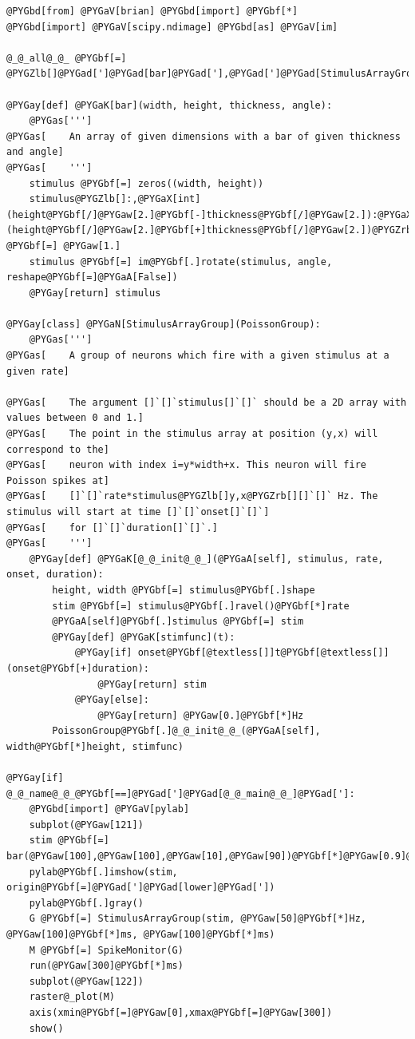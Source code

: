 \documentclass[letterpaper,10pt,english]{manual}
\begin{document}
\begin{Verbatim}[commandchars=@\[\]]
@PYGbd[from] @PYGaV[brian] @PYGbd[import] @PYGbf[*]
@PYGbd[import] @PYGaV[scipy.ndimage] @PYGbd[as] @PYGaV[im]

@_@_all@_@_ @PYGbf[=] @PYGZlb[]@PYGad[']@PYGad[bar]@PYGad['],@PYGad[']@PYGad[StimulusArrayGroup]@PYGad[']@PYGZrb[]

@PYGay[def] @PYGaK[bar](width, height, thickness, angle):
    @PYGas[''']
@PYGas[    An array of given dimensions with a bar of given thickness and angle]
@PYGas[    ''']
    stimulus @PYGbf[=] zeros((width, height))
    stimulus@PYGZlb[]:,@PYGaX[int](height@PYGbf[/]@PYGaw[2.]@PYGbf[-]thickness@PYGbf[/]@PYGaw[2.]):@PYGaX[int](height@PYGbf[/]@PYGaw[2.]@PYGbf[+]thickness@PYGbf[/]@PYGaw[2.])@PYGZrb[] @PYGbf[=] @PYGaw[1.]
    stimulus @PYGbf[=] im@PYGbf[.]rotate(stimulus, angle, reshape@PYGbf[=]@PYGaA[False])
    @PYGay[return] stimulus

@PYGay[class] @PYGaN[StimulusArrayGroup](PoissonGroup):
    @PYGas[''']
@PYGas[    A group of neurons which fire with a given stimulus at a given rate]

@PYGas[    The argument []`[]`stimulus[]`[]` should be a 2D array with values between 0 and 1.]
@PYGas[    The point in the stimulus array at position (y,x) will correspond to the]
@PYGas[    neuron with index i=y*width+x. This neuron will fire Poisson spikes at]
@PYGas[    []`[]`rate*stimulus@PYGZlb[]y,x@PYGZrb[][]`[]` Hz. The stimulus will start at time []`[]`onset[]`[]`]
@PYGas[    for []`[]`duration[]`[]`.]
@PYGas[    ''']
    @PYGay[def] @PYGaK[@_@_init@_@_](@PYGaA[self], stimulus, rate, onset, duration):
        height, width @PYGbf[=] stimulus@PYGbf[.]shape
        stim @PYGbf[=] stimulus@PYGbf[.]ravel()@PYGbf[*]rate
        @PYGaA[self]@PYGbf[.]stimulus @PYGbf[=] stim
        @PYGay[def] @PYGaK[stimfunc](t):
            @PYGay[if] onset@PYGbf[@textless[]]t@PYGbf[@textless[]](onset@PYGbf[+]duration):
                @PYGay[return] stim
            @PYGay[else]:
                @PYGay[return] @PYGaw[0.]@PYGbf[*]Hz
        PoissonGroup@PYGbf[.]@_@_init@_@_(@PYGaA[self], width@PYGbf[*]height, stimfunc)

@PYGay[if] @_@_name@_@_@PYGbf[==]@PYGad[']@PYGad[@_@_main@_@_]@PYGad[']:
    @PYGbd[import] @PYGaV[pylab]
    subplot(@PYGaw[121])
    stim @PYGbf[=] bar(@PYGaw[100],@PYGaw[100],@PYGaw[10],@PYGaw[90])@PYGbf[*]@PYGaw[0.9]@PYGbf[+]@PYGaw[0.1]
    pylab@PYGbf[.]imshow(stim, origin@PYGbf[=]@PYGad[']@PYGad[lower]@PYGad['])
    pylab@PYGbf[.]gray()
    G @PYGbf[=] StimulusArrayGroup(stim, @PYGaw[50]@PYGbf[*]Hz, @PYGaw[100]@PYGbf[*]ms, @PYGaw[100]@PYGbf[*]ms)
    M @PYGbf[=] SpikeMonitor(G)
    run(@PYGaw[300]@PYGbf[*]ms)
    subplot(@PYGaw[122])
    raster@_plot(M)
    axis(xmin@PYGbf[=]@PYGaw[0],xmax@PYGbf[=]@PYGaw[300])
    show()
\end{Verbatim}
\end{document}
